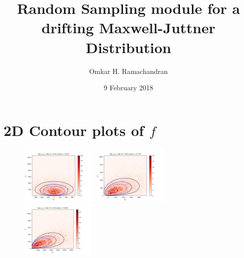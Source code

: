 \documentclass[english]{article}
\title{Random Sampling module for a drifting Maxwell-Juttner Distribution}
\author{Omkar H. Ramachandran}
\date{9 February 2018}
\begin{document}
\maketitle
\section{2D Contour plots of $f$}
\begin{figure}[h]
	\centering
	\includegraphics[width=0.33\textwidth]{plot_distribution_2D_u_0p01_A_0p01.png}
	\includegraphics[width=0.33\textwidth]{plot_distribution_2D_u_0p7_A_0p01.png}
	\includegraphics[width=0.32\textwidth]{plot_distribution_2D_u_0p99_A_0p01.png}


\end{figure}
\end{document}
